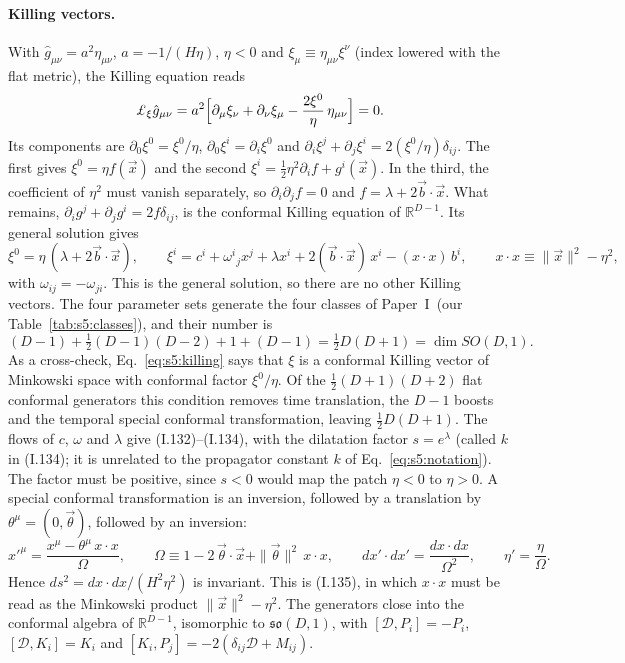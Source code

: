 \documentclass[aps,prd,onecolumn,10pt,nofootinbib,floatfix]{revtex4-2}
\newcommand{\PI}{Paper~I}
\newcommand{\eqI}[1]{(I.#1)}
\begin{document}
\paragraph*{Killing vectors.}
With $\hat g_{\mu\nu}=a^2\eta_{\mu\nu}$, $a=-1/(H\eta)$, $\eta<0$ and $\xi_\mu\equiv\eta_{\mu\nu}\xi^\nu$ (index lowered with the flat metric), the Killing equation reads
\begin{equation}
\sfiveLie_\xi\hat g_{\mu\nu}=a^2\Big[\partial_\mu\xi_\nu+\partial_\nu\xi_\mu-\frac{2\xi^0}{\eta}\,\eta_{\mu\nu}\Big]=0 .
\label{eq:s5:killing}
\end{equation}
Its components are $\partial_0\xi^0=\xi^0/\eta$, $\partial_0\xi^i=\partial_i\xi^0$ and $\partial_i\xi^j+\partial_j\xi^i=2(\xi^0/\eta)\delta_{ij}$.
The first gives $\xi^0=\eta f(\vec x)$ and the second $\xi^i=\frac12\eta^2\partial_if+g^i(\vec x)$.
In the third, the coefficient of $\eta^2$ must vanish separately, so $\partial_i\partial_jf=0$ and $f=\lambda+2\vec b\cdot\vec x$.
What remains, $\partial_ig^j+\partial_jg^i=2f\delta_{ij}$, is the conformal Killing equation of $\mathbb R^{D-1}$.
Its general solution gives
\begin{equation}
\xi^0=\eta\,(\lambda+2\vec b\cdot\vec x),\qquad
\xi^i=c^i+\omega^i{}_jx^j+\lambda x^i+2(\vec b\cdot\vec x)\,x^i-(x\cdot x)\,b^i,\qquad x\cdot x\equiv\|\vec x\|^2-\eta^2 ,
\label{eq:s5:killsol}
\end{equation}
with $\omega_{ij}=-\omega_{ji}$.
This is the general solution, so there are no other Killing vectors.
The four parameter sets generate the four classes of \PI\ (our Table~\ref{tab:s5:classes}), and their number is
\begin{equation}
(D-1)+\tfrac12(D-1)(D-2)+1+(D-1)=\tfrac12D(D+1)=\dim SO(D,1).
\label{eq:s5:count}
\end{equation}
As a cross-check, Eq.~\eqref{eq:s5:killing} says that $\xi$ is a conformal Killing vector of Minkowski space with conformal factor $\xi^0/\eta$.
Of the $\frac12(D+1)(D+2)$ flat conformal generators this condition removes time translation, the $D-1$ boosts and the temporal special conformal transformation, leaving $\frac12D(D+1)$.
The flows of $c$, $\omega$ and $\lambda$ give \eqI{132}--\eqI{134}, with the dilatation factor $s=e^\lambda$ (called $k$ in \eqI{134}; it is unrelated to the propagator constant $k$ of Eq.~\eqref{eq:s5:notation}). The factor must be positive, since $s<0$ would map the patch $\eta<0$ to $\eta>0$.
A special conformal transformation is an inversion, followed by a translation by $\theta^\mu=(0,\vec\theta)$, followed by an inversion:
\begin{equation}
x'^\mu=\frac{x^\mu-\theta^\mu\,x\cdot x}{\Omega},\qquad \Omega\equiv1-2\,\vec\theta\cdot\vec x+\|\vec\theta\|^2\,x\cdot x,\qquad
dx'\cdot dx'=\frac{dx\cdot dx}{\Omega^2},\qquad \eta'=\frac{\eta}{\Omega} .
\label{eq:s5:sct}
\end{equation}
Hence $ds^2=dx\cdot dx/(H^2\eta^2)$ is invariant.
This is \eqI{135}, in which $x\cdot x$ must be read as the Minkowski product $\|\vec x\|^2-\eta^2$.
The generators close into the conformal algebra of $\mathbb R^{D-1}$, isomorphic to $\mathfrak{so}(D,1)$, with
$[\mathcal D,P_i]=-P_i$, $[\mathcal D,K_i]=K_i$ and $[K_i,P_j]=-2(\delta_{ij}\mathcal D+M_{ij})$.
\end{document}
